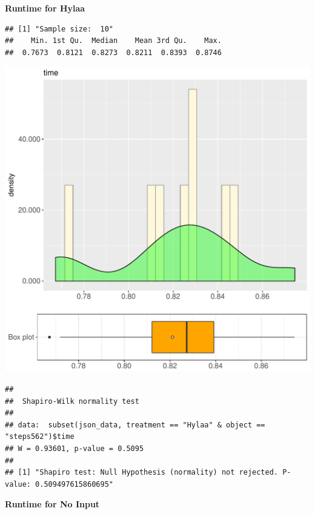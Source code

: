 \documentclass{article}\usepackage[]{graphicx}\usepackage[]{color}
\makeatletter
\def\maxwidth{ %
  \ifdim\Gin@nat@width>\linewidth
    \linewidth
  \else
    \Gin@nat@width
  \fi
}
\newenvironment{kframe}{%
 \def\at@end@of@kframe{}%
 \ifinner\ifhmode%
  \def\at@end@of@kframe{\end{minipage}}%
  \begin{minipage}{\columnwidth}%
 \fi\fi%
 \def\FrameCommand##1{\hskip\@totalleftmargin \hskip-\fboxsep
 \colorbox{shadecolor}{##1}\hskip-\fboxsep
     \hskip-\linewidth \hskip-\@totalleftmargin \hskip\columnwidth}%
 \MakeFramed {\advance\hsize-\width
   \@totalleftmargin\z@ \linewidth\hsize
   \@setminipage}}%
 {\par\unskip\endMakeFramed%
 \at@end@of@kframe}
\newenvironment{knitrout}{}{} %
\makeatother
\begin{document}
 \textbf{Runtime for Hylaa}
\begin{knitrout}
\color{fgcolor}\begin{kframe}
\begin{verbatim}
## [1] "Sample size:  10"
##    Min. 1st Qu.  Median    Mean 3rd Qu.    Max. 
##  0.7673  0.8121  0.8273  0.8211  0.8393  0.8746
\end{verbatim}
\end{kframe}
\includegraphics[width=\maxwidth]{figure/RH4_Hylaa_steps562-1} 
\begin{kframe}\begin{verbatim}
## 
## 	Shapiro-Wilk normality test
## 
## data:  subset(json_data, treatment == "Hylaa" & object == "steps562")$time
## W = 0.93601, p-value = 0.5095
## 
## [1] "Shapiro test: Null Hypothesis (normality) not rejected. P-value: 0.509497615860695"
\end{verbatim}
\end{kframe}
\end{knitrout}
 \textbf{Runtime for No Input}
\end{document}

